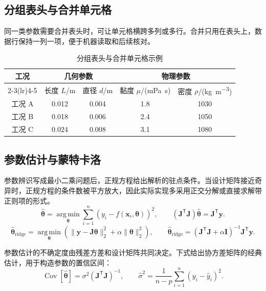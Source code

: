 \subsection{分组表头与合并单元格}

同一类参数需要合并表头时，可让单元格横跨多列或多行。合并只用在表头上，数据行保持一列一项，便于机器读取和后续核对。
\begin{table}[htbp]
  \centering
  \caption{分组表头与合并单元格示例}
  \label{tab:grouped}
  \begin{tabular}{ccccc}
    \toprule
    \multirow{2}{*}{\textbf{工况}} & \multicolumn{2}{c}{\textbf{几何参数}} & \multicolumn{2}{c}{\textbf{物理参数}}\\
    \cmidrule(lr){2-3}\cmidrule(lr){4-5}
    & 长度 $L$/m & 直径 $d$/m & 黏度 $\mu$/(\si{\milli\pascal\second}) & 密度 $\rho$/(\si{\kilogram\per\meter\cubed})\\
    \midrule
    工况 A & 0.012 & 0.004 & 1.8 & 1030\\
    工况 B & 0.018 & 0.006 & 2.4 & 1050\\
    工况 C & 0.024 & 0.008 & 3.1 & 1080\\
    \bottomrule
  \end{tabular}
\end{table}

\subsection{参数估计与蒙特卡洛}

参数辨识写成最小二乘问题后，正规方程给出解析的驻点条件。当设计矩阵接近奇异时，正规方程的条件数被平方放大，因此实际实现多采用正交分解或直接求解带正则项的形式。
\begin{equation}
  \hat{\bm{\theta}}=\operatorname*{arg\,min}_{\bm{\theta}}
  \sum_{i=1}^{n}\left(y_i-f(\bm{x}_i,\bm{\theta})\right)^2,\qquad
  (\bm{J}^{\mathsf T}\bm{J})\hat{\bm{\theta}}
  =\bm{J}^{\mathsf T}\bm{y}.
  \label{eq:least-squares}
\end{equation}
\begin{equation}
  \hat{\bm{\theta}}_{\mathrm{ridge}}
  =\operatorname*{arg\,min}_{\bm{\theta}}
  \left(\|\bm{y}-\bm{J}\bm{\theta}\|_2^2
  +\alpha\|\bm{\theta}\|_2^2\right),\qquad
  \hat{\bm{\theta}}_{\mathrm{ridge}}
  =(\bm{J}^{\mathsf T}\bm{J}+\alpha\bm{I})^{-1}
  \bm{J}^{\mathsf T}\bm{y}.
  \label{eq:ridge}
\end{equation}

参数估计的不确定度由残差方差和设计矩阵共同决定。下式给出协方差矩阵的经典估计，用于构造参数的置信区间：
\begin{equation}
  \operatorname{Cov}[\hat{\bm{\theta}}]
  =\sigma^2(\bm{J}^{\mathsf T}\bm{J})^{-1},\qquad
  \hat{\sigma}^2=\frac{1}{n-p}\sum_{i=1}^{n}(y_i-\hat{y}_i)^2.
  \label{eq:covariance-estimate}
\end{equation}

